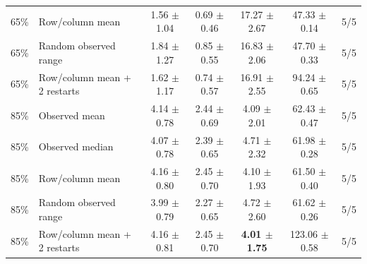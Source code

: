 \begin{table}[t]
{\begin{tabular}{llccccc}
65\% & Row/column mean & 1.56 $\pm$ 1.04 & 0.69 $\pm$ 0.46 & 17.27 $\pm$ 2.67 & 47.33 $\pm$ 0.14 & 5/5 \\
65\% & Random observed range & 1.84 $\pm$ 1.27 & 0.85 $\pm$ 0.55 & 16.83 $\pm$ 2.06 & 47.70 $\pm$ 0.33 & 5/5 \\
65\% & Row/column mean + 2 restarts & 1.62 $\pm$ 1.17 & 0.74 $\pm$ 0.57 & 16.91 $\pm$ 2.55 & 94.24 $\pm$ 0.65 & 5/5 \\
85\% & Observed mean & 4.14 $\pm$ 0.78 & 2.44 $\pm$ 0.69 & 4.09 $\pm$ 2.01 & 62.43 $\pm$ 0.47 & 5/5 \\
85\% & Observed median & 4.07 $\pm$ 0.78 & 2.39 $\pm$ 0.65 & 4.71 $\pm$ 2.32 & 61.98 $\pm$ 0.28 & 5/5 \\
85\% & Row/column mean & 4.16 $\pm$ 0.80 & 2.45 $\pm$ 0.70 & 4.10 $\pm$ 1.93 & 61.50 $\pm$ 0.40 & 5/5 \\
85\% & Random observed range & 3.99 $\pm$ 0.79 & 2.27 $\pm$ 0.65 & 4.72 $\pm$ 2.60 & 61.62 $\pm$ 0.26 & 5/5 \\
85\% & Row/column mean + 2 restarts & 4.16 $\pm$ 0.81 & 2.45 $\pm$ 0.70 & \textbf{4.01 $\pm$ 1.75} & 123.06 $\pm$ 0.58 & 5/5 \\
\bottomrule
\end{tabular}
}
\end{table}
